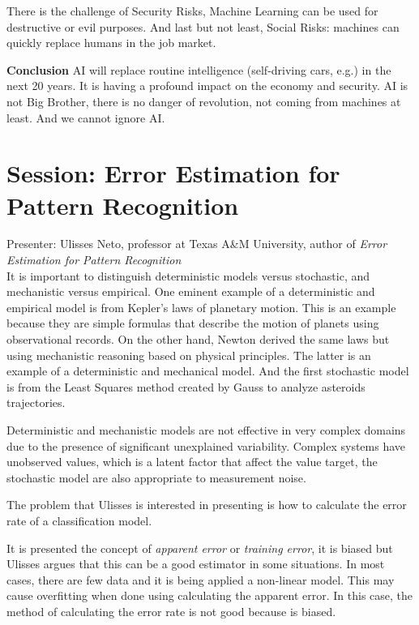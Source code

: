 \documentclass[9pt,a4paper]{article}
\begin{document}
There is the challenge of Security Risks, Machine Learning can be used for destructive or evil purposes. 
And last but not least, Social Risks: machines can quickly replace humans in the job market.

\textbf{Conclusion} AI will replace routine intelligence (self-driving cars, e.g.) in the next 20 years. It is having a profound impact on the economy and security. AI is not Big Brother, there is no danger of revolution, not coming from machines at least. And we cannot ignore AI. 

\section*{Session: Error Estimation for Pattern Recognition}

Presenter: Ulisses Neto, professor at Texas A\&M University, author of \textit{Error Estimation for Pattern Recognition} \citep{ulisses}\\

It is important to distinguish deterministic models versus stochastic, and mechanistic versus empirical. 
One eminent example of a deterministic and empirical model is from Kepler's laws of planetary motion. 
This is an example because they are simple formulas that describe the motion of planets using observational records. On the other hand, Newton derived the same laws but using mechanistic reasoning based on physical principles. The latter is an example of a deterministic and mechanical model. And the first stochastic model is from the Least Squares method created by Gauss to analyze asteroids trajectories.

Deterministic and mechanistic models are not effective in very complex domains due to the presence of significant unexplained variability.
Complex systems have unobserved values, which is a latent factor that affect the value target, the stochastic model are also appropriate to measurement noise.

The problem that Ulisses is interested in presenting is how to calculate the error rate of a classification model.

It is presented the concept of \textit{apparent error} or \textit{training error}, it is biased but Ulisses argues that this can be a good estimator in some situations.  
In most cases, there are few data and it is being applied a non-linear model. This may cause overfitting when done using calculating the apparent error. In this case, the method of calculating the error rate is not good because is biased.
\end{document}
